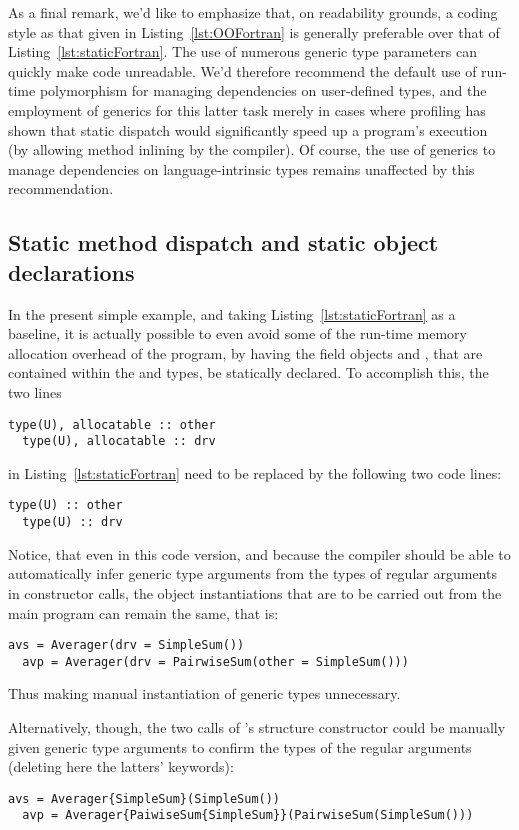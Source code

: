 \documentclass[11pt,oneside]{report}
\newcommand{\code}[1]{{\selectfont\ttfamily{#1}}}
\begin{document}
As a final remark, we'd like to emphasize that, on readability grounds,
a coding style as that given in Listing~\ref{lst:OOFortran} is
generally preferable over that of
Listing~\ref{lst:staticFortran}. The use of numerous generic type
parameters can quickly make code unreadable. We'd therefore recommend
the default use of run-time polymorphism for managing dependencies on
user-defined types, and the employment of generics for this latter
task merely in cases where profiling has shown that static dispatch
would significantly speed up a program's execution (by allowing method
inlining by the compiler). Of course, the use of generics to manage
dependencies on language-intrinsic types remains unaffected by this
recommendation.

\subsection{Static method dispatch and static object declarations}

In the present simple example, and taking Listing~\ref{lst:staticFortran}
as a baseline, it is actually possible to even avoid some of the
run-time memory allocation overhead of the program, by having the
field objects \code{other} and \code{drv}, that are contained within
the \code{PairwiseSum} and \code{Averager} types, be statically
declared. To accomplish this, the two lines
\begin{lstlisting}[language=LFortran,style=boxed]
  type(U), allocatable :: other
  type(U), allocatable :: drv
\end{lstlisting}
in Listing~\ref{lst:staticFortran} need to be replaced by the
following two code lines:
\begin{lstlisting}[language=LFortran,style=boxed]
  type(U) :: other
  type(U) :: drv
\end{lstlisting}

Notice, that even in this code version, and because the compiler
should be able to automatically infer generic type arguments from the
types of regular arguments in constructor calls, the object
instantiations that are to be carried out from the main program can
remain the same, that is:
\begin{lstlisting}[language=LFortran,style=boxed]
  avs = Averager(drv = SimpleSum())
  avp = Averager(drv = PairwiseSum(other = SimpleSum()))
\end{lstlisting}
Thus making manual instantiation of generic types unnecessary.

Alternatively, though, the two calls of \code{Averager}'s structure
constructor could be manually given generic type arguments to confirm
the types of the regular arguments (deleting here the latters'
keywords):
\begin{lstlisting}[language=LFortran,style=boxed]
  avs = Averager{SimpleSum}(SimpleSum())
  avp = Averager{PaiwiseSum{SimpleSum}}(PairwiseSum(SimpleSum()))
\end{lstlisting}
\end{document}
